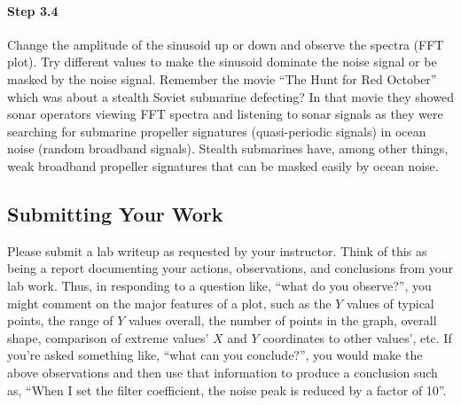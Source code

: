 \paragraph{Step 3.4} Change the amplitude of the sinusoid up or down
and observe the spectra (FFT plot). Try different values to make the
sinusoid dominate the noise signal or be masked by the noise
signal. Remember the movie ``The Hunt for Red October'' which was
about a stealth Soviet submarine defecting? In that movie they showed
sonar operators viewing FFT spectra and listening to sonar signals as
they were searching for submarine propeller signatures (quasi-periodic
signals) in ocean noise (random broadband signals). Stealth submarines
have, among other things, weak broadband propeller signatures that can
be masked easily by ocean noise.

\subsection{Submitting Your Work}

Please submit a lab writeup as requested by your instructor. Think of
this as being a report documenting your actions, observations, and
conclusions from your lab work. Thus, in responding to a question
like, ``what do you observe?'', you might comment on the major
features of a plot, such as the $Y$ values of typical points, the
range of $Y$ values overall, the number of points in the graph,
overall shape, comparison of extreme values' $X$ and $Y$ coordinates
to other values', etc. If you're asked something like, ``what can you
conclude?'', you would make the above observations and then use that
information to produce a conclusion such as, ``When I set the filter
coefficient, the noise peak is reduced by a factor of 10''.

